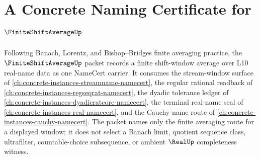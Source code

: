\chapter{A Concrete Naming Certificate for $\FiniteShiftAverageUp$}
\label{ch:concrete-instances-finite-shift-average-namecert}

Following Banach, Lorentz, and Bishop--Bridges finite averaging practice, the $\FiniteShiftAverageUp$ packet records a finite shift-window average over L10 real-name data as one NameCert carrier. It consumes the stream-window surface of \autoref{ch:concrete-instances-streamname-namecert}, the regular rational readback of \autoref{ch:concrete-instances-regseqrat-namecert}, the dyadic tolerance ledger of \autoref{ch:concrete-instances-dyadicratcore-namecert}, the terminal real-name seal of \autoref{ch:concrete-instances-real-namecert}, and the Cauchy-name route of \autoref{ch:concrete-instances-cauchy-namecert}. The packet names only the finite averaging route for a displayed window; it does not select a Banach limit, quotient sequence class, ultrafilter, countable-choice subsequence, or ambient $\RealUp$ completeness witness.

